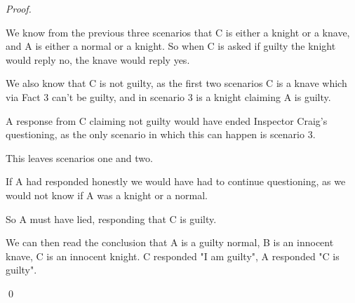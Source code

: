 \documentclass{article}
\begin{document}
\textit{Proof.}
\begin{addmargin}[0.75cm]{0cm}
	We know from the previous three scenarios that C is either a knight or a knave, and A is either a normal or a knight.	So when C is asked if guilty the knight would reply no, the knave would reply yes.
	
	We also know that C is not guilty, as the first two scenarios C is a knave which via Fact 3 can't be guilty, and in scenario 3 is a knight claiming A is guilty.
	
	A response from C claiming not guilty would have ended Inspector Craig's questioning, as the only scenario in which this can happen is scenario 3.
	
	This leaves scenarios one and two.
	
	If A had responded honestly we would have had to continue questioning, as we would not know if A was a knight or a normal.
	
	So A must have lied, responding that C is guilty.
	
	We can then read the conclusion that A is a guilty normal, B is an innocent knave, C is an innocent knight. C responded "I am guilty", A responded "C is guilty".
	
	
	
	\qed
\end{addmargin}
\end{document}
